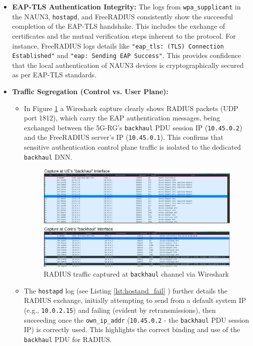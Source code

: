\begin{itemize}
    \item \textbf{\ac{EAP-TLS} Authentication Integrity:} The logs from \texttt{wpa\_supplicant} in the \acs{NAUN3}, \texttt{hostapd}, and FreeRADIUS consistently show the successful completion of the \ac{EAP-TLS} handshake. This includes the exchange of certificates and the mutual verification steps inherent to the protocol. For instance, FreeRADIUS logs details like \texttt{"eap\_tls: (TLS) Connection Established"} and \texttt{"eap: Sending EAP Success"}. This provides confidence that the local authentication of \ac{NAUN3} devices is cryptographically secured as per \ac{EAP-TLS} standards.

    \item{
        \textbf{Traffic Segregation (Control vs. User Plane):}
        \begin{itemize}
            \item In Figure \ref{fig:RADIUS_traffic_via_backhaul} a Wireshark capture clearly shows \ac{RADIUS} packets (\ac{UDP} port 1812), which carry the \ac{EAP} authentication messages, being exchanged between the \ac{5G-RG}'s \texttt{backhaul} \ac{PDU} session \ac{IP} (\texttt{10.45.0.2}) and the FreeRADIUS server's \ac{IP} (\texttt{10.45.0.1}). This confirms that sensitive authentication control plane traffic is isolated to the dedicated \texttt{backhaul} \ac{DNN}.

            \begin{figure}
                \centering
                \includegraphics[width=0.75\linewidth]{figs/RADIUS_traffic_via_backhaul.png}
                \caption{\acs{RADIUS} traffic captured at \texttt{backhaul} channel via Wireshark}
                \label{fig:RADIUS_traffic_via_backhaul}
            \end{figure}

            \item The \texttt{hostapd} log (see Listing \ref{lst:hostapd_fail} ) further details the \ac{RADIUS} exchange, initially attempting to send from a default system \ac{IP} (e.g., \texttt{10.0.2.15}) and failing (evident by retransmissions), then succeeding once the \texttt{own\_ip\_addr} (\texttt{10.45.0.2} - the \texttt{backhaul} \ac{PDU} session \ac{IP}) is correctly used. This highlights the correct binding and use of the \texttt{backhaul} \ac{PDU} for \ac{RADIUS}.


\end{itemize}}
\end{itemize}
